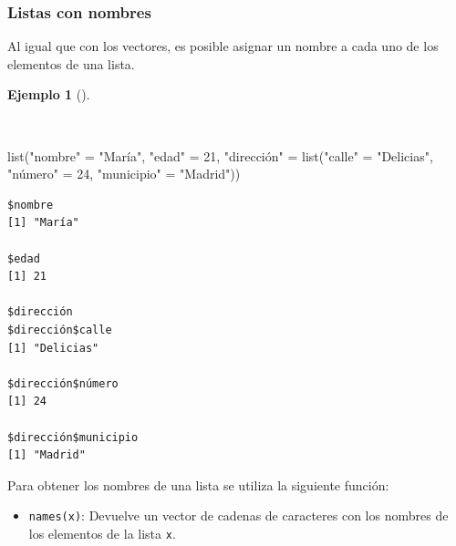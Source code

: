 \documentclass[
  spanish,
  a4paper,
]{scrreport}
\newenvironment{Shaded}{\begin{snugshade}}{\end{snugshade}}
\newcommand{\DecValTok}[1]{\textcolor[rgb]{0.68,0.00,0.00}{#1}}
\newcommand{\FunctionTok}[1]{\textcolor[rgb]{0.28,0.35,0.67}{#1}}
\newcommand{\NormalTok}[1]{\textcolor[rgb]{0.00,0.23,0.31}{#1}}
\newcommand{\OtherTok}[1]{\textcolor[rgb]{0.00,0.23,0.31}{#1}}
\newcommand{\StringTok}[1]{\textcolor[rgb]{0.13,0.47,0.30}{#1}}
\providecommand{\tightlist}{%
  \setlength{\itemsep}{0pt}\setlength{\parskip}{0pt}}
\theoremstyle{definition}
\theoremstyle{definition}
\newtheorem{example}{Ejemplo}[chapter]
\theoremstyle{remark}
\begin{document}
\subsubsection{Listas con nombres}\label{listas-con-nombres}

Al igual que con los vectores, es posible asignar un nombre a cada uno
de los elementos de una lista.

\begin{example}[]\protect\hypertarget{exm-creacion-listas-nombres}{}\label{exm-creacion-listas-nombres}

~

\begin{Shaded}
\begin{Highlighting}[]
\FunctionTok{list}\NormalTok{(}\StringTok{"nombre"} \OtherTok{=} \StringTok{"María"}\NormalTok{, }\StringTok{"edad"} \OtherTok{=} \DecValTok{21}\NormalTok{, }\StringTok{"dirección"} \OtherTok{=} \FunctionTok{list}\NormalTok{(}\StringTok{"calle"} \OtherTok{=} \StringTok{"Delicias"}\NormalTok{, }\StringTok{"número"} \OtherTok{=} \DecValTok{24}\NormalTok{, }\StringTok{"municipio"} \OtherTok{=} \StringTok{"Madrid"}\NormalTok{))}
\end{Highlighting}
\end{Shaded}

\begin{verbatim}
$nombre
[1] "María"

$edad
[1] 21

$dirección
$dirección$calle
[1] "Delicias"

$dirección$número
[1] 24

$dirección$municipio
[1] "Madrid"
\end{verbatim}

\end{example}

Para obtener los nombres de una lista se utiliza la siguiente función:

\begin{itemize}
\tightlist
\item
  \texttt{names(x)}: Devuelve un vector de cadenas de caracteres con los
  nombres de los elementos de la lista \texttt{x}.
\end{itemize}
\end{document}
